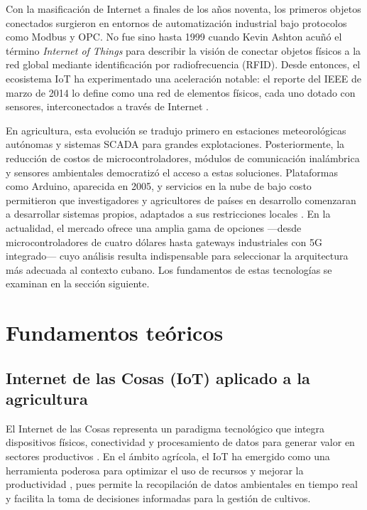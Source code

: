 Con la masificación de Internet a finales de los años noventa, los primeros objetos conectados surgieron en entornos de automatización industrial bajo protocolos como Modbus y OPC. No fue sino hasta 1999 cuando Kevin Ashton acuñó el término \emph{Internet of Things} para describir la visión de conectar objetos físicos a la red global mediante identificación por radiofrecuencia (RFID). Desde entonces, el ecosistema IoT ha experimentado una aceleración notable: el reporte del IEEE de marzo de 2014 lo define como una red de elementos físicos, cada uno dotado con sensores, interconectados a través de Internet \citep{ieeereport2014}.

En agricultura, esta evolución se tradujo primero en estaciones meteorológicas autónomas y sistemas SCADA para grandes explotaciones. Posteriormente, la reducción de costos de microcontroladores, módulos de comunicación inalámbrica y sensores ambientales democratizó el acceso a estas soluciones. Plataformas como Arduino, aparecida en 2005, y servicios en la nube de bajo costo permitieron que investigadores y agricultores de países en desarrollo comenzaran a desarrollar sistemas propios, adaptados a sus restricciones locales \citep{arduinoopensource}. En la actualidad, el mercado ofrece una amplia gama de opciones ---desde microcontroladores de cuatro dólares hasta gateways industriales con 5G integrado--- cuyo análisis resulta indispensable para seleccionar la arquitectura más adecuada al contexto cubano. Los fundamentos de estas tecnologías se examinan en la sección siguiente.

\section{Fundamentos teóricos}\label{sec:fundamentos}

\subsection{Internet de las Cosas (IoT) aplicado a la agricultura}\label{subsec:iot-agricultura}

El Internet de las Cosas representa un paradigma tecnológico que integra dispositivos físicos, conectividad y procesamiento de datos para generar valor en sectores productivos \citep{ieeereport2014}. En el ámbito agrícola, el IoT ha emergido como una herramienta poderosa para optimizar el uso de recursos y mejorar la productividad \citep{quiroz2024transformacion}, pues permite la recopilación de datos ambientales en tiempo real y facilita la toma de decisiones informadas para la gestión de cultivos.

